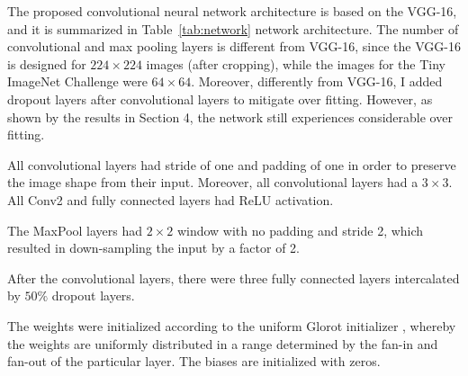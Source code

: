 \documentclass[10pt,twocolumn,letterpaper]{article}
\begin{document}
The proposed convolutional neural network architecture is based on the VGG-16, and it is summarized in Table~\ref{tab:network} network architecture. The number of convolutional and max pooling layers is different from VGG-16, since the VGG-16 is designed for $224 \times 224$ images (after cropping), while the images for the Tiny ImageNet Challenge were $64\times 64$. Moreover, differently from VGG-16, I added dropout layers after convolutional layers to mitigate over fitting. However, as shown by the results in Section 4, the network still experiences considerable over fitting.

All convolutional layers had stride of one and padding of one in order to preserve the image shape from their input. Moreover, all convolutional layers had a $3\times 3$. All Conv2 and fully connected layers had ReLU activation.

The MaxPool layers had $2\times 2$ window with no padding and stride 2, which resulted in down-sampling the input by a factor of 2. 

After the convolutional layers, there were three fully connected layers intercalated by $50\%$ dropout layers. 

The weights were initialized according to the uniform Glorot initializer \cite{glorot2010}, whereby the weights are uniformly distributed in a range determined by the fan-in and fan-out of the particular layer. The biases are initialized with zeros. 
\end{document}
